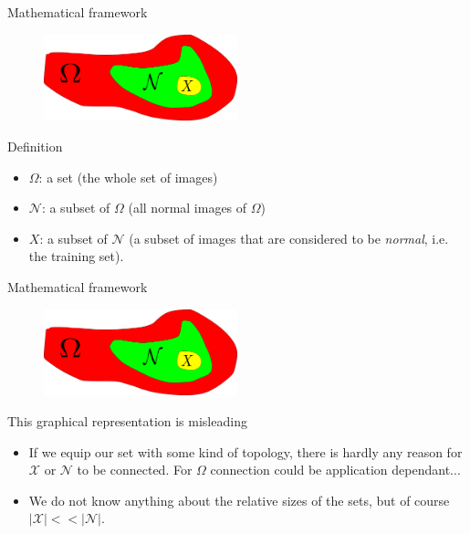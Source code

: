 \documentclass[xcolor=pdftex,dvipsnames,table,mathserif]{beamer}
\begin{document}
\begin{frame}{Mathematical framework}

\begin{figure}[ht]
  \centering
  \includegraphics[width=0.5\textwidth]{sets}
\end{figure}


  \begin{block}{Definition}
\begin{itemize}
  \item $\Omega$: a set (the whole set of images)
  \item $\mathcal{N}$: a subset of $\Omega$ (all normal images of $\Omega$)
  \item $X$: a subset of $\mathcal{N}$ (a subset of images that are considered to be \emph{normal}, i.e. the \alert{training set}).
\end{itemize}
  \end{block}

\end{frame}


\begin{frame}{Mathematical framework}

\begin{figure}[ht]
  \centering
  \includegraphics[width=0.5\textwidth]{sets}
\end{figure}


\begin{alertblock}{This graphical representation is misleading}

\begin{itemize}
\item If we equip our set with some kind of topology, there is hardly any reason for $\mathcal{X}$ or $\mathcal{N}$ to be connected. For $\Omega$ connection could be application dependant...
\item We do not know anything about the relative sizes of the sets, but of course $|\mathcal{X}| << |\mathcal{N}|$.
\end{itemize}

\end{alertblock}

\end{frame}
\end{document}
